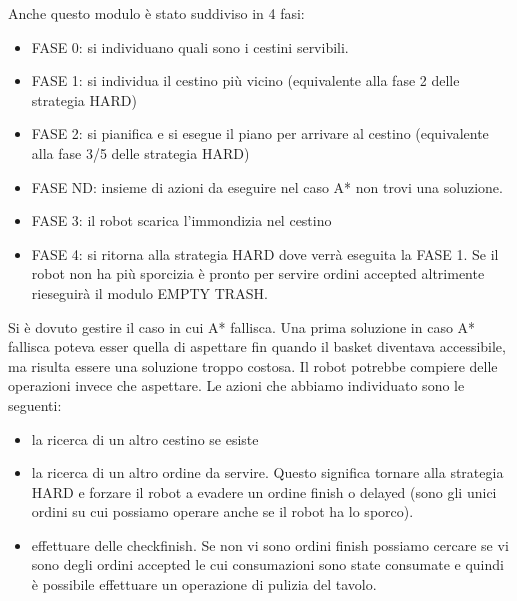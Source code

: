 Anche questo modulo è stato suddiviso in 4 fasi:
\begin{itemize}
  \item FASE 0: si individuano quali sono i cestini servibili.
  \item FASE 1: si individua il cestino più vicino (equivalente alla fase 2 delle strategia HARD)
  \item FASE 2: si pianifica e si esegue il piano per arrivare al cestino (equivalente alla fase 3/5 delle strategia HARD)
  \item FASE ND: insieme di azioni da eseguire nel caso A* non trovi una soluzione.
  \item FASE 3: il robot scarica l'immondizia nel cestino
  \item FASE 4: si ritorna alla strategia HARD dove verrà eseguita la FASE 1. Se il robot non ha più sporcizia è pronto per servire ordini accepted altrimente rieseguirà il modulo EMPTY TRASH.
\end{itemize}

Si è dovuto gestire il caso in cui A* fallisca. Una prima soluzione in caso A* fallisca poteva esser quella di aspettare fin quando il basket diventava accessibile, ma risulta essere una soluzione troppo costosa. Il robot potrebbe compiere delle operazioni invece che aspettare. Le azioni che abbiamo individuato sono le seguenti:
\begin{itemize}
  \item la ricerca di un altro cestino se esiste
  \item la ricerca di un altro ordine da servire. Questo significa tornare alla strategia HARD e forzare il robot a evadere un ordine finish o delayed (sono gli unici ordini su cui possiamo operare anche se il robot ha lo sporco).
  \item effettuare delle checkfinish. Se non vi sono ordini finish possiamo cercare se vi sono degli ordini accepted le cui consumazioni sono state consumate e quindi è possibile effettuare un operazione di pulizia del tavolo.
\end{itemize}

